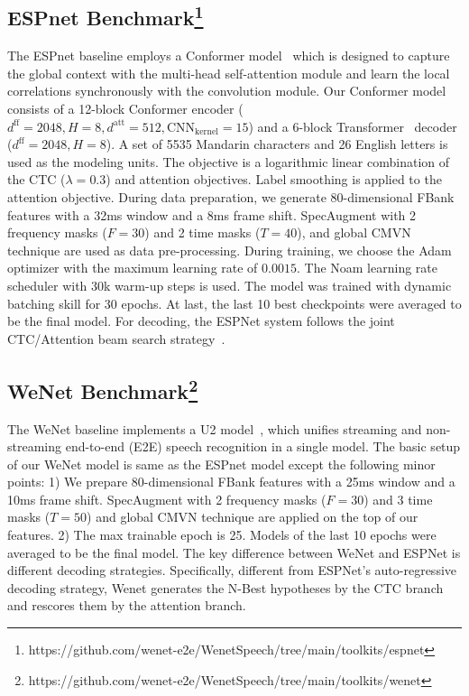 \documentclass{article}
\begin{document}
\subsection[ESPnet Benchmark]{ESPnet Benchmark\footnote{https://github.com/wenet-e2e/WenetSpeech/tree/main/toolkits/espnet}}
\vspace{-0.5em}
The ESPnet baseline employs a Conformer model~\cite{gulati2020conformer,guo2021recent} which is designed to capture the global context with the multi-head self-attention module and learn the local correlations synchronously with the convolution module. Our Conformer model consists of a 12-block Conformer encoder ($d^{\text{ff}} = 2048, H = 8, d^{\text{att}} = 512, \text{CNN}_{\text{kernel}} = 15$) and a 6-block Transformer~\cite{vaswani2017attention} decoder ($d^{\text{ff}} = 2048, H = 8$). A set of 5535 Mandarin characters and  26 English letters is used as the modeling units. The objective is a logarithmic linear combination of the CTC ($\lambda = 0.3$) and attention objectives. Label smoothing is applied to the attention objective. During data preparation, we generate 80-dimensional FBank features with a 32ms window and a 8ms frame shift. SpecAugment with 2 frequency masks ($F = 30$) and 2 time masks ($T = 40$), and global CMVN technique are used as data pre-processing. During training, we choose the Adam optimizer with the maximum learning rate of $0.0015$. The Noam learning rate scheduler with 30k warm-up steps is used. The model was trained with dynamic batching skill for 30 epochs. At last, the last 10 best checkpoints were averaged to be the final model. For decoding, the ESPNet system follows the joint CTC/Attention beam search strategy~\cite{hori2017joint}.

\vspace{-1em}
\subsection[WeNet Benchmark]{WeNet Benchmark\footnote{https://github.com/wenet-e2e/WenetSpeech/tree/main/toolkits/wenet}}
\vspace{-0.5em}
The WeNet baseline implements a U2 model~\cite{yao2021wenet}, which unifies streaming and non-streaming end-to-end (E2E) speech recognition in a single model. The basic setup of our WeNet model is same as the ESPnet model except the following minor points: 1) We prepare 80-dimensional FBank features with a 25ms window and a 10ms frame shift. SpecAugment with 2 frequency masks ($F = 30$) and 3 time masks ($T = 50$) and global CMVN technique are applied on the top of our features. 2) The max trainable epoch is 25. Models of the last 10 epochs were averaged to be the final model. The key difference between WeNet and ESPNet is different decoding strategies. Specifically, different from ESPNet's auto-regressive decoding strategy, Wenet generates the N-Best hypotheses by the CTC branch and rescores them by the attention branch.
\end{document}
